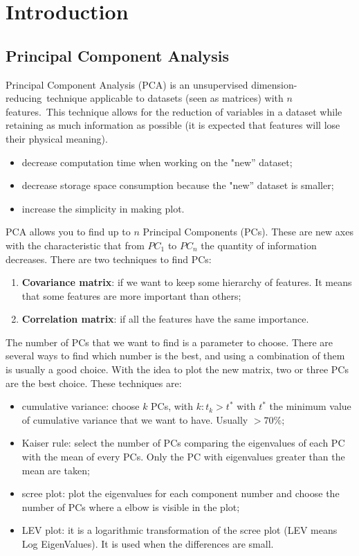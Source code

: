 \documentclass[../main.tex]{subfiles}
\begin{document}
\chapter{Introduction}
\section{Principal Component Analysis}
Principal Component Analysis (PCA) is an unsupervised dimension-reducing technique applicable to datasets (seen as matrices) with $n$ features. This technique allows for the reduction of variables in a dataset while retaining as much information as possible (it is expected that features will lose their physical meaning). 
\begin{itemize}
    \item decrease computation time when working on the "new'' dataset;
    \item decrease storage space consumption because the "new'' dataset is smaller;
    \item increase the simplicity in making plot.
\end{itemize}

PCA allows you to find up to \(n\) Principal Components (PCs). These are new axes with the characteristic that from \(PC_1\) to \(PC_n\) the quantity of information decreases. There are two techniques to find PCs:
\begin{enumerate}
    \item \textbf{Covariance matrix}: if we want to keep some hierarchy of features. It means that some features are more important than others;
    \item \textbf{Correlation matrix}: if all the features have the same importance.
\end{enumerate}

The number of PCs that we want to find is a parameter to choose. There are several ways to find which number is the best, and using a combination of them is usually a good choice. With the idea to plot the new matrix, two or three PCs are the best choice.
These techniques are:
\begin{itemize}
    \item cumulative variance: choose $k$ PCs, with $k : t_k > t^*$ with $t^*$ the minimum value of cumulative variance that we want to have. Usually $>70\%$;
    \item Kaiser rule: select the number of PCs comparing the eigenvalues of each PC with the mean of every PCs. Only the PC with eigenvalues greater than the mean are taken;
    \item scree plot: plot the eigenvalues for each component number and choose the number of PCs where a elbow is visible in the plot;
    \item LEV plot: it is a logarithmic transformation of the scree plot (LEV means Log EigenValues). It is used when the differences are small.
\end{itemize}
\end{document}
